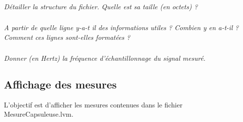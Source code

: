 \documentclass[10pt]{article}
\newif\ifprof
\begin{document}
\subparagraph{}
\textit{Détailler la structure du fichier. Quelle est sa taille (en octets) ? }
\ifprof
\begin{corrige}
Le fichier contient 22 lignes de commentaires. Les informations sont ensuite stockées sous forme de colonne. 

Sur une même ligne, les informations sont séparées par des tabulations.

Si les informations sont codées en ASCII, un caractère est codé sur un octet. 
Une ligne de mesure comprends 28 caractères :
\begin{itemize}
\item une mesure est constituée de 8 ou 9 caractères (signe -, 7 chiffres, 1 virgule);
\item les mesures sont séparées par des tabulations (au nombre de 2);
\item une ligne est suivie d'un saut de ligne. 
\end{itemize}

Il y a environ 100 000 lignes. Le fichier fait donc approximativement 2 800 000 octets soit 2,8 Mo. Cela est confirmé par le système d'exploitation.

\end{corrige}
\else
\fi
\subparagraph{}
\textit{A partir de quelle ligne y-a-t il des informations utiles ? Combien y en a-t-il ? Comment ces lignes sont-elles formatées ?}
\ifprof
\begin{corrige}
Il y a des informations utiles à partir de la 23ième ligne. Ces informations sont séparées par des tabulations. La virgule est utilisé comme séparateur des nombres décimaux. 

\end{corrige}
\else
\fi

\subparagraph{}
\textit{Donner (en Hertz) la fréquence d'échantillonnage du signal mesuré.}
\ifprof
\begin{corrige}
Une information est stockée tous les millièmes de secondes. L'échantillonnage est d'1kHz.
\end{corrige}
\else
\fi

\subsection*{Affichage des mesures}

\begin{obj}
L'objectif est d'afficher les mesures contenues dans le fichier \textsf{MesureCapsuleuse.lvm}.
\end{obj}
\end{document}
